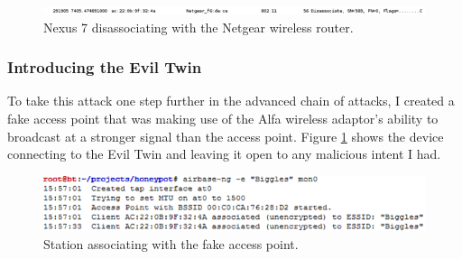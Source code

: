 \begin{figure}[h!]
\includegraphics[width=\linewidth]{research/attackvectors/figures/ddos-4.png}
\caption{Nexus 7 disassociating with the Netgear wireless router.}
\end{figure}

\subsubsection*{Introducing the Evil Twin}
To take this attack one step further in the advanced chain of attacks, I created a fake access point that was making use of the Alfa wireless adaptor's ability to broadcast at a stronger signal than the access point. Figure \ref{ddos-5} shows the device connecting to the Evil Twin and leaving it open to any malicious intent I had.

\begin{figure}[h!]
\includegraphics[width=\linewidth]{research/attackvectors/figures/ddos-5.png}
\caption{Station associating with the fake access point.}
\label{ddos-5}
\end{figure}